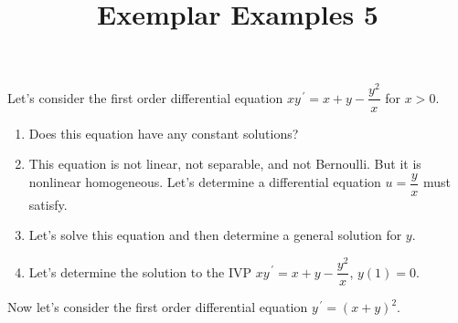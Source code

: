 \documentclass{ximera}
\begin{document}
\begin{abstract}
 \end{abstract}

    \title{Exemplar Examples 5}
    
    \maketitle


Let's consider the first order differential equation $xy^{\,\prime}=x+y-\dfrac{y^2}{x}$ for $x>0$.

\begin{enumerate}

\item Does this equation have any constant solutions?   

\vfill

\item This equation is not linear, not separable, and not Bernoulli.  But it is nonlinear homogeneous.  Let's determine a differential equation $u=\dfrac{y}{x}$ must satisfy.

\vfill
\vfill




\item Let's solve this equation and then determine a general solution for $y$.




\vfill
\vfill
\vfill

\item  Let's determine the solution to the IVP $xy^{\,\prime}=x+y-\dfrac{y^2}{x}$, $y(1)=0$.


\vspace{1cm}


\end{enumerate}



\newpage


Now let's consider the first order differential equation $y^{\,\prime}=(x+y)^2$.
\end{document}
